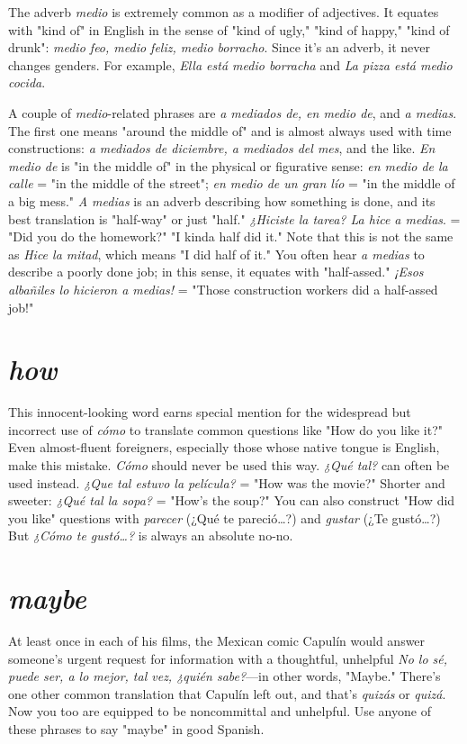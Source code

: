 The adverb \emph{medio} is extremely common as a modifier of adjectives. It equates with "kind of" in English in the sense of "kind of
ugly," "kind of happy," "kind of drunk": \emph{medio feo, medio feliz, medio
borracho}. Since it's an adverb, it never changes genders. For example,
\emph{Ella está medio borracha} and \emph{La pizza está medio cocida}.

A couple of \emph{medio}-related phrases are \emph{a mediados de, en medio de}, and \emph{a medias}. The first one means "around the middle of"
and is almost always used with time constructions: \emph{a mediados de diciembre, a mediados del mes}, and the like. \emph{En medio de} is "in the
middle of" in the physical or figurative sense: \emph{en medio de la calle}
= "in the middle of the street"; \emph{en medio de un gran lío} = "in the
middle of a big mess." \emph{A medias} is an adverb describing how something is done, and its best translation is "half-way" or just "half." \emph{¿Hiciste la tarea? La hice a medias}. = "Did you do the homework?" "I
kinda half did it." Note that this is not the same as \emph{Hice la mitad},
which means "I did half of it." You often hear \emph{a medias} to describe a
poorly done job; in this sense, it equates with "half-assed." \emph{¡Esos albañiles lo hicieron a medias!} = "Those construction workers did a
half-assed job!"

\section{\emph{how}}

This innocent-looking word earns special mention for the
widespread but incorrect use of \emph{cómo} to translate common questions
like "How do you like it?" Even almost-fluent foreigners, especially
those whose native tongue is English, make this mistake. \emph{Cómo}
should never be used this way. \emph{¿Qué tal?} can often be used instead.
\emph{¿Que tal estuvo la película?} = "How was the movie?" Shorter and
sweeter: \emph{¿Qué tal la sopa?} = "How's the soup?" You can also construct "How did you like" questions with \emph{parecer} (¿Qué te pareció\ldots{}?) and \emph{gustar} (¿Te gustó\ldots{}?) But \emph{¿Cómo te gustó\ldots{}?}
is always an absolute no-no.

\section{\emph{maybe}}

At least once in each of his films, the Mexican comic Capulín would answer someone's urgent request for information with a
thoughtful, unhelpful \emph{No lo sé, puede ser, a lo mejor, tal vez, ¿quién
sabe?}---in other words, "Maybe." There's one other common translation that Capulín left out, and that's \emph{quizás} or \emph{quizá}. Now you too
are equipped to be noncommittal and unhelpful. Use anyone of these
phrases to say "maybe" in good Spanish.

